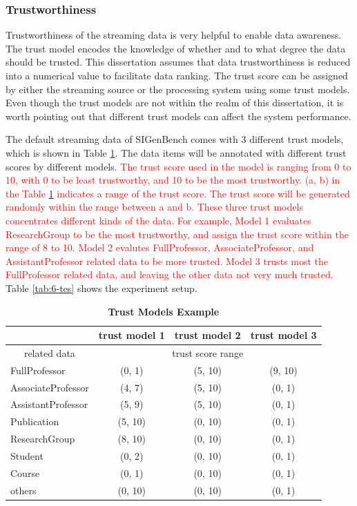 \subsubsection{Trustworthiness}
Trustworthiness of the streaming data is very helpful to enable data awareness. 
The trust model encodes the knowledge of whether and to what degree the data should be trusted.
This dissertation assumes that data trustworthiness is reduced into a numerical value to facilitate data ranking.
The trust score can be assigned by either the streaming source or the processing system using some trust models. 
Even though the trust models are not within the realm of this dissertation, it is worth pointing out that different trust models can affect the system performance. 

The default streaming data of SIGenBench comes with 3 different trust models, which is shown in Table \ref{tab:6-tme}.
The data items will be annotated with different trust scores by different models.
\textcolor{red}{
The trust score used in the model is ranging from 0 to 10, with 0 to be least trustworthy, and 10 to be the most trustworthy.
(a, b) in the Table \ref{tab:6-tme} indicates a range of the trust score. 
The trust score will be generated randomly within the range between a and b. 
These three trust models concentrates different kinds of the data. 
For example, Model 1 evaluates ResearchGroup to be the most trustworthy, and assign the trust score within the range of 8 to 10.
Model 2 evalutes FullProfessor, AssociateProfessor, and AssistantProfessor related data to be more trusted.
Model 3 trusts most the FullProfessor related data, and leaving the other data not very much trusted.
}
Table \ref{tab:6-tes} shows the experiment setup.

\begin{table}[!htbp]
	\centering
    \caption{\textbf{Trust Models Example}}
    \label{tab:6-tme}
    \begin{tabular}{|l||c|c|c|} \hline
    	& trust model 1 & trust model 2 & trust model 3 \\ \hline
     \multicolumn{1}{|c||}{related data} & \multicolumn{3}{c|}{trust score range} \\ \hhline{|=#=|=|=|}
     FullProfessor & (0, 1) & (5, 10) & (9, 10) \\ \hline
     AssociateProfessor & (4, 7) & (5, 10) & (0, 1) \\ \hline
     AssistantProfessor & (5, 9) & (5, 10) & (0, 1) \\ \hline
     Publication & (5, 10) & (0, 10) & (0, 1) \\ \hline
     ResearchGroup & (8, 10) & (0, 10) & (0, 1) \\ \hline
     Student & (0, 2) & (0, 10) & (0, 1) \\ \hline
     Course & (0, 1) & (0, 10) & (0, 1) \\ \hline
     others & (0, 10) & (0, 10) & (0, 1) \\ \hline    
    \end{tabular}
\end{table} 


